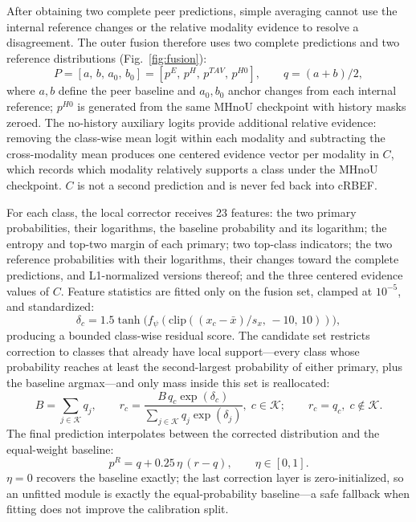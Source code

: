 \documentclass[10pt,twocolumn,letterpaper]{article}
\newcommand{\Kset}{\mathcal{K}}
\newcommand{\clip}{\mathrm{clip}}
\begin{document}
After obtaining two complete peer predictions, simple averaging cannot use the internal reference changes or the relative modality evidence to resolve a disagreement.
The outer fusion therefore uses two complete predictions and two reference distributions (Fig.~\ref{fig:fusion}):
\begin{equation}
  P = [a,\, b,\, a_0,\, b_0] = [p^{E},\, p^{H},\, p^{TAV},\, p^{H0}], \qquad q = (a+b)/2,
  \label{eq:baseline}
\end{equation}
where $a,b$ define the peer baseline and $a_0,b_0$ anchor changes from each internal reference; $p^{H0}$ is generated from the same MHnoU checkpoint with history masks zeroed.
The no-history auxiliary logits provide additional relative evidence: removing the class-wise mean logit within each modality and subtracting the cross-modality mean produces one centered evidence vector per modality in $C$, which records which modality relatively supports a class under the MHnoU checkpoint.
$C$ is not a second prediction and is never fed back into cRBEF.

For each class, the local corrector receives 23 features: the two primary probabilities, their logarithms, the baseline probability and its logarithm; the entropy and top-two margin of each primary; two top-class indicators; the two reference probabilities with their logarithms, their changes toward the complete predictions, and L1-normalized versions thereof; and the three centered evidence values of $C$.
Feature statistics are fitted only on the fusion set, clamped at $10^{-5}$, and standardized:
\begin{equation}
  \delta_c = 1.5\tanh\!\big(f_\psi(\clip((x_c - \bar{x})/s_x,\, -10,\, 10))\big),
  \label{eq:corrector}
\end{equation}
producing a bounded class-wise residual score.
The candidate set restricts correction to classes that already have local support---every class whose probability reaches at least the second-largest probability of either primary, plus the baseline argmax---and only mass inside this set is reallocated:
\begin{equation}
  B = \sum_{j\in\Kset} q_j, \qquad
  r_c = \frac{B\, q_c \exp(\delta_c)}{\sum_{j\in\Kset} q_j \exp(\delta_j)},\; c\in\Kset; \qquad
  r_c = q_c,\; c\notin\Kset.
  \label{eq:candidate}
\end{equation}
The final prediction interpolates between the corrected distribution and the equal-weight baseline:
\begin{equation}
  p^{R} = q + 0.25\,\eta\,(r - q), \qquad \eta \in [0,1].
  \label{eq:interp}
\end{equation}
$\eta=0$ recovers the baseline exactly; the last correction layer is zero-initialized, so an unfitted module is exactly the equal-probability baseline---a safe fallback when fitting does not improve the calibration split.
\end{document}
